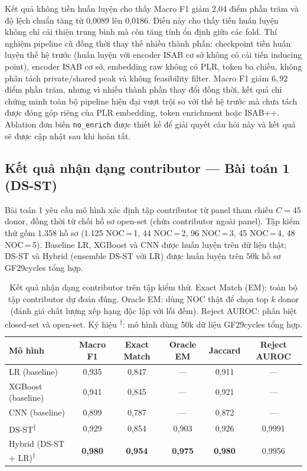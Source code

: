 \documentclass[12pt,a4paper]{article}
\begin{document}
Kết quả không tiền huấn luyện cho thấy Macro F1 giảm 2,04 điểm phần trăm và độ lệch chuẩn tăng từ 0,0089 lên 0,0186. Điều này cho thấy tiền huấn luyện không chỉ cải thiện trung bình mà còn tăng tính ổn định giữa các fold. Thí nghiệm pipeline cũ đồng thời thay thế nhiều thành phần: checkpoint tiền huấn luyện thế hệ trước (huấn luyện với encoder ISAB cơ sở không có cải tiến inducing point), encoder ISAB cơ sở, embedding raw không có PLR, token ba chiều, không phân tách private/shared peak và không feasibility filter. Macro F1 giảm $6{,}92$ điểm phần trăm, nhưng vì nhiều thành phần thay đổi đồng thời, kết quả chỉ chứng minh toàn bộ pipeline hiện đại vượt trội so với thế hệ trước mà chưa tách được đóng góp riêng của PLR embedding, token enrichment hoặc ISAB++. Ablation đơn biến \texttt{no\_enrich} được thiết kế để giải quyết câu hỏi này và kết quả sẽ được cập nhật sau khi hoàn tất.

\subsection{Kết quả nhận dạng contributor — Bài toán 1 (DS-ST)}

Bài toán 1 yêu cầu mô hình xác định tập contributor từ panel tham chiếu $C=45$ donor, đồng thời từ chối hồ sơ open-set (chứa contributor ngoài panel). Tập kiểm thử gồm 1.358 hồ sơ (1.125 NOC\,=\,1, 44 NOC\,=\,2, 96 NOC\,=\,3, 45 NOC\,=\,4, 48 NOC\,=\,5). Baseline LR, XGBoost và CNN được huấn luyện trên dữ liệu thật; DS-ST và Hybrid (ensemble DS-ST với LR) được huấn luyện trên 50k hồ sơ GF29cycles tổng hợp.

\begin{table}[H]
\centering
\caption{Kết quả nhận dạng contributor trên tập kiểm thử. Exact Match (EM): toàn bộ tập contributor dự đoán đúng. Oracle EM: dùng NOC thật để chọn top $k$ donor (đánh giá chất lượng xếp hạng độc lập với lỗi đếm). Reject AUROC: phân biệt closed-set và open-set. Ký hiệu \textsuperscript{†}: mô hình dùng 50k dữ liệu GF29cycles tổng hợp.}
\label{tab:donor_id}
\small
\begin{tabular}{lccccc}
\toprule
\textbf{Mô hình} & \textbf{Macro F1} & \textbf{Exact Match} & \textbf{Oracle EM} & \textbf{Jaccard} & \textbf{Reject AUROC} \\
\midrule
LR (baseline)          & 0,935 & 0,847 & ---   & 0,911 & --- \\
XGBoost (baseline)     & 0,941 & 0,845 & ---   & 0,921 & --- \\
CNN (baseline)         & 0,899 & 0,787 & ---   & 0,872 & --- \\
DS-ST\textsuperscript{†} & 0,929 & 0,854 & 0,903 & 0,926 & 0,9991 \\
Hybrid (DS-ST + LR)\textsuperscript{†} & \textbf{0,980} & \textbf{0,954} & \textbf{0,975} & \textbf{0,980} & 0,9956 \\
\bottomrule
\end{tabular}
\end{table}
\end{document}
